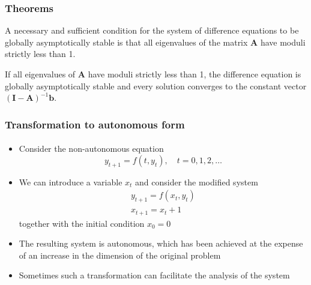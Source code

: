 \documentclass[10pt,usenames,dvipsnames]{beamer}
\theoremstyle{definition}
\begin{document}
\begin{frame}[fragile]
\frametitle{Theorems}
\begin{theorem}
	A necessary and sufficient condition for the system of difference equations to be globally asymptotically stable is that all eigenvalues of the matrix $\mathbf{A}$ have moduli strictly less than 1.
\end{theorem}

\begin{theorem}
	If all eigenvalues of $\mathbf{A}$ have moduli strictly less than 1, the difference equation is globally asymptotically stable and every solution converges to the constant vector $\mathbf{(I - A)}^{-1}\mathbf{b}$.
\end{theorem}
\end{frame}


\begin{frame}
	\frametitle{Transformation to autonomous form}
	\framesubtitle{}
		\begin{itemize}\itemsep1em
		\item Consider the non-autonomous equation \[ y_{t+1} = f(t, y_{t}), \quad t = 0, 1, 2, \ldots \]
		\item We can introduce a variable $ x_t $ and consider the modified system 
			\[
		\begin{array}{lcl}
			y_{t+1} = f(x_t, y_t)\\
			x_{t+1} = x_t + 1
		\end{array}
		\] together with the initial condition $ x_0=0 $
		\item The resulting system is autonomous, which has been achieved at the expense of an increase in the dimension of the original problem
		\item Sometimes such a transformation can facilitate the analysis of the system 
	\end{itemize}
\end{frame}

\end{document}
